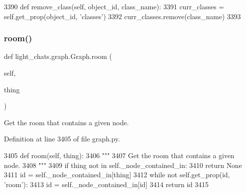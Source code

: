 \begin{DoxyCode}
3390     \textcolor{keyword}{def }remove\_class(self, object\_id, class\_name):
3391         curr\_classes = self.get\_prop(object\_id, \textcolor{stringliteral}{'classes'})
3392         curr\_classes.remove(class\_name)
3393 
\end{DoxyCode}
\mbox{\label{classlight__chats_1_1graph_1_1Graph_a90e0b9f3f4a4acc29c49cc730aad1539}} 
\subsubsection{\texorpdfstring{room()}{room()}}
{\footnotesize\ttfamily def light\+\_\+chats.\+graph.\+Graph.\+room (\begin{DoxyParamCaption}\item[{}]{self,  }\item[{}]{thing }\end{DoxyParamCaption})}

\begin{DoxyVerb}Get the room that contains a given node.
\end{DoxyVerb}
 

Definition at line 3405 of file graph.\+py.


\begin{DoxyCode}
3405     \textcolor{keyword}{def }room(self, thing):
3406         \textcolor{stringliteral}{"""}
3407 \textcolor{stringliteral}{        Get the room that contains a given node.}
3408 \textcolor{stringliteral}{        """}
3409         \textcolor{keywordflow}{if} thing \textcolor{keywordflow}{not} \textcolor{keywordflow}{in} self.\_node\_contained\_in:
3410             \textcolor{keywordflow}{return} \textcolor{keywordtype}{None}
3411         id = self.\_node\_contained\_in[thing]
3412         \textcolor{keywordflow}{while} \textcolor{keywordflow}{not} self.get\_prop(id, \textcolor{stringliteral}{'room'}):
3413             id = self.\_node\_contained\_in[id]
3414         \textcolor{keywordflow}{return} id
3415 
\end{DoxyCode}
\mbox{\label{classlight__chats_1_1graph_1_1Graph_a783ebf83adeed30c0ba89679f535d33c}} 
